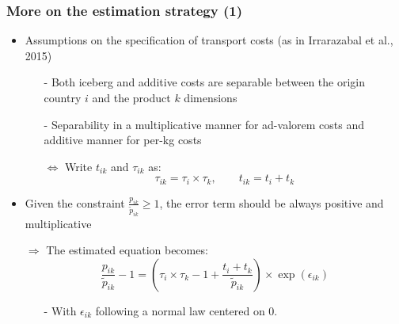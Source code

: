 \documentclass[10 pt,Helvetica, french]{beamer}
\begin{document}
\begin{frame}[label=app_method_1]
\frametitle{More on the estimation strategy (1)}
\begin{itemize}
\item Assumptions on the specification of transport costs (as in Irrarazabal et al., 2015) \vspace{0.1cm}
\begin{itemize}
\item[-] Both iceberg and additive costs are separable between the origin country $i$ and the product $k$ dimensions \vspace{0.1cm}
\item[-] Separability in a multiplicative manner for ad-valorem costs and additive manner for per-kg costs \vspace{0.1cm}
\item[$\Leftrightarrow$] Write $t_{ik}$ and $\tau_{ik}$ as:
\begin{equation}
 \tau_{ik} = \tau_{i} \times \tau_{k}, \qquad t_{ik} = t_{i} + t_{k} \label{eq:specifTC}
 \end{equation}
\end{itemize}
\item Given the constraint $\frac{p_{ik}}{\widetilde{p}_{ik}} \geq 1$, the error term should be always positive and multiplicative \vspace{0.1cm}
\item[$\Rightarrow$] The estimated equation becomes:
$$\frac{p_{ik}}{\widetilde{p}_{ik}}-1 =\left(\tau_{i} \times \tau_{k} -1+\frac{t_{i} + t_{k}}{\widetilde{p}_{ik}} \right)\times \exp(\epsilon_{ik})$$
\begin{itemize}
\item[-] With $\epsilon_{ik}$ following a normal law centered on 0.
\end{itemize}
\end{itemize}
\hyperlink{slide_method}{}
\end{frame}
\end{document}
